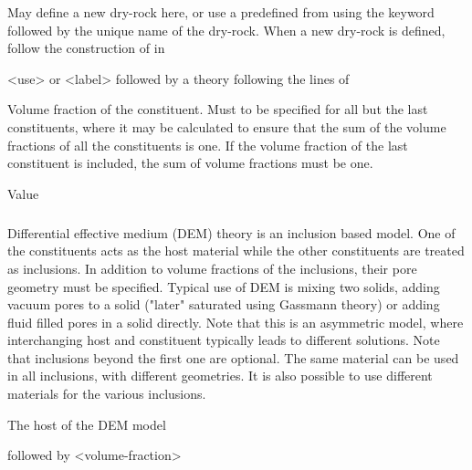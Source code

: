 {
 \slist
   \item \Description May define a new dry-rock here, or use a predefined  from  using the keyword  followed by the unique name of the dry-rock. When a new dry-rock is defined, follow the construction of  in 
   \item \Argument <use> or <label> followed by a theory following the lines of 
   \item \Default
 \elist

 \slist
   \item \Description Volume fraction of the constituent. Must to be specified for all but the last constituents, where it may be calculated to ensure that the sum of the volume fractions of all the constituents is one. If the volume fraction of the last constituent is included, the sum of volume fractions must be one.
   \item \Argument Value
   \item \Default
 \elist

\subparagraph{}
 \slist
   \item \Description Differential effective medium (DEM) theory is an inclusion based model. One of the constituents acts as the host material while the other constituents are treated as inclusions. In addition to volume fractions of the inclusions, their pore geometry must be specified. Typical use of DEM is mixing two solids, adding vacuum pores to a solid ("later" saturated using Gassmann theory) or adding fluid filled pores in a solid directly. Note that this is an asymmetric model, where interchanging host and constituent typically leads to different solutions. Note that inclusions beyond the first one are optional. The same material can be used in all inclusions, with different geometries. It is also possible to use different materials for the various inclusions.
   \item \Argument
   \item \Default
 \elist

 \slist
   \item \Description The host of the DEM model
   \item {} followed by <volume-fraction>
   \item \Default
 \elist

}

